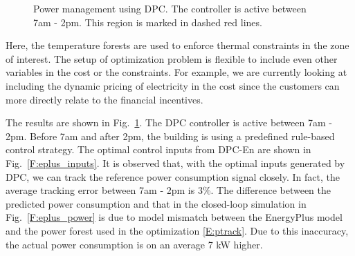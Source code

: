 \begin{figure}[h!]
	\caption{Power management using DPC. The controller is active between 7am - 2pm. This region is marked in dashed red lines.}
	\captionsetup{justification=centering}
	\label{F:eplus_track}
\end{figure}

Here, the temperature forests are used to enforce thermal constraints in the zone of interest. The setup of optimization problem is flexible to include even other variables in the cost or the constraints. For example, we are currently looking at including the dynamic pricing of electricity in the cost since the customers can more directly relate to the financial incentives.

The results are shown in Fig.~\ref{F:eplus_track}. 
The DPC controller is active between 7am - 2pm. Before 7am and after 2pm, the building is using a predefined rule-based control strategy.
The optimal control inputs from DPC-En are shown in Fig.~\ref{F:eplus_inputs}. It is observed that, with the optimal inputs generated by DPC, we can track the reference power consumption signal closely. In fact, the average tracking error between 7am - 2pm is 3\%. The difference between the predicted power consumption and that in the closed-loop simulation in Fig.~\ref{F:eplus_power} is due to model mismatch between the EnergyPlus model and the power forest used in the optimization \eqref{E:ptrack}. Due to this inaccuracy, the actual power consumption is on an average 7 kW higher.

